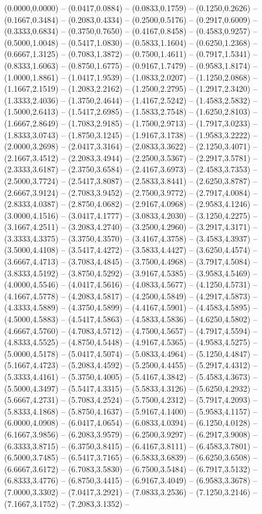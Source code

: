  (0.0000,0.0000) -- (0.0417,0.0884) -- (0.0833,0.1759) -- (0.1250,0.2626) -- (0.1667,0.3484) -- (0.2083,0.4334) -- (0.2500,0.5176) -- (0.2917,0.6009) -- (0.3333,0.6834) -- (0.3750,0.7650) -- (0.4167,0.8458) -- (0.4583,0.9257) -- (0.5000,1.0048) -- (0.5417,1.0830) -- (0.5833,1.1604) -- (0.6250,1.2368) -- (0.6667,1.3125) -- (0.7083,1.3872) -- (0.7500,1.4611) -- (0.7917,1.5341) -- (0.8333,1.6063) -- (0.8750,1.6775) -- (0.9167,1.7479) -- (0.9583,1.8174) -- (1.0000,1.8861) -- (1.0417,1.9539) -- (1.0833,2.0207) -- (1.1250,2.0868) -- (1.1667,2.1519) -- (1.2083,2.2162) -- (1.2500,2.2795) -- (1.2917,2.3420) -- (1.3333,2.4036) -- (1.3750,2.4644) -- (1.4167,2.5242) -- (1.4583,2.5832) -- (1.5000,2.6413) -- (1.5417,2.6985) -- (1.5833,2.7548) -- (1.6250,2.8103) -- (1.6667,2.8649) -- (1.7083,2.9185) -- (1.7500,2.9713) -- (1.7917,3.0233) -- (1.8333,3.0743) -- (1.8750,3.1245) -- (1.9167,3.1738) -- (1.9583,3.2222) -- (2.0000,3.2698) -- (2.0417,3.3164) -- (2.0833,3.3622) -- (2.1250,3.4071) -- (2.1667,3.4512) -- (2.2083,3.4944) -- (2.2500,3.5367) -- (2.2917,3.5781) -- (2.3333,3.6187) -- (2.3750,3.6584) -- (2.4167,3.6973) -- (2.4583,3.7353) -- (2.5000,3.7724) -- (2.5417,3.8087) -- (2.5833,3.8441) -- (2.6250,3.8787) -- (2.6667,3.9124) -- (2.7083,3.9452) -- (2.7500,3.9772) -- (2.7917,4.0084) -- (2.8333,4.0387) -- (2.8750,4.0682) -- (2.9167,4.0968) -- (2.9583,4.1246) -- (3.0000,4.1516) -- (3.0417,4.1777) -- (3.0833,4.2030) -- (3.1250,4.2275) -- (3.1667,4.2511) -- (3.2083,4.2740) -- (3.2500,4.2960) -- (3.2917,4.3171) -- (3.3333,4.3375) -- (3.3750,4.3570) -- (3.4167,4.3758) -- (3.4583,4.3937) -- (3.5000,4.4108) -- (3.5417,4.4272) -- (3.5833,4.4427) -- (3.6250,4.4574) -- (3.6667,4.4713) -- (3.7083,4.4845) -- (3.7500,4.4968) -- (3.7917,4.5084) -- (3.8333,4.5192) -- (3.8750,4.5292) -- (3.9167,4.5385) -- (3.9583,4.5469) -- (4.0000,4.5546) -- (4.0417,4.5616) -- (4.0833,4.5677) -- (4.1250,4.5731) -- (4.1667,4.5778) -- (4.2083,4.5817) -- (4.2500,4.5849) -- (4.2917,4.5873) -- (4.3333,4.5889) -- (4.3750,4.5899) -- (4.4167,4.5901) -- (4.4583,4.5895) -- (4.5000,4.5883) -- (4.5417,4.5863) -- (4.5833,4.5836) -- (4.6250,4.5802) -- (4.6667,4.5760) -- (4.7083,4.5712) -- (4.7500,4.5657) -- (4.7917,4.5594) -- (4.8333,4.5525) -- (4.8750,4.5448) -- (4.9167,4.5365) -- (4.9583,4.5275) -- (5.0000,4.5178) -- (5.0417,4.5074) -- (5.0833,4.4964) -- (5.1250,4.4847) -- (5.1667,4.4723) -- (5.2083,4.4592) -- (5.2500,4.4455) -- (5.2917,4.4312) -- (5.3333,4.4161) -- (5.3750,4.4005) -- (5.4167,4.3842) -- (5.4583,4.3673) -- (5.5000,4.3497) -- (5.5417,4.3315) -- (5.5833,4.3126) -- (5.6250,4.2932) -- (5.6667,4.2731) -- (5.7083,4.2524) -- (5.7500,4.2312) -- (5.7917,4.2093) -- (5.8333,4.1868) -- (5.8750,4.1637) -- (5.9167,4.1400) -- (5.9583,4.1157) -- (6.0000,4.0908) -- (6.0417,4.0654) -- (6.0833,4.0394) -- (6.1250,4.0128) -- (6.1667,3.9856) -- (6.2083,3.9579) -- (6.2500,3.9297) -- (6.2917,3.9008) -- (6.3333,3.8715) -- (6.3750,3.8415) -- (6.4167,3.8111) -- (6.4583,3.7801) -- (6.5000,3.7485) -- (6.5417,3.7165) -- (6.5833,3.6839) -- (6.6250,3.6508) -- (6.6667,3.6172) -- (6.7083,3.5830) -- (6.7500,3.5484) -- (6.7917,3.5132) -- (6.8333,3.4776) -- (6.8750,3.4415) -- (6.9167,3.4049) -- (6.9583,3.3678) -- (7.0000,3.3302) -- (7.0417,3.2921) -- (7.0833,3.2536) -- (7.1250,3.2146) -- (7.1667,3.1752) -- (7.2083,3.1352) -- 
